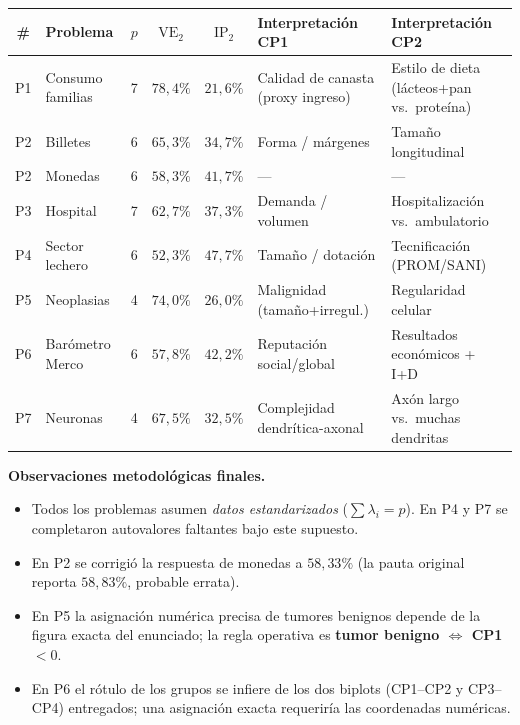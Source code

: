 \documentclass[11pt,a4paper]{article}
\begin{document}
\begin{center}\small
\begin{tabular}{clcccp{4cm}p{4cm}}\toprule
\# & Problema & $p$ & $\mathrm{VE}_2$ & $\mathrm{IP}_2$ & Interpretación CP1 & Interpretación CP2\\\midrule
P1 & Consumo familias    & 7 & $78{,}4\%$ & $21{,}6\%$ & Calidad de canasta (proxy ingreso) & Estilo de dieta (lácteos+pan vs.\ proteína)\\
P2 & Billetes            & 6 & $65{,}3\%$ & $34{,}7\%$ & Forma / márgenes              & Tamaño longitudinal\\
P2 & Monedas             & 6 & $58{,}3\%$ & $41{,}7\%$ & ---                            & ---\\
P3 & Hospital            & 7 & $62{,}7\%$ & $37{,}3\%$ & Demanda / volumen              & Hospitalización vs.\ ambulatorio\\
P4 & Sector lechero      & 6 & $52{,}3\%$ & $47{,}7\%$ & Tamaño / dotación             & Tecnificación (PROM/SANI)\\
P5 & Neoplasias          & 4 & $74{,}0\%$ & $26{,}0\%$ & Malignidad (tamaño+irregul.)   & Regularidad celular\\
P6 & Barómetro Merco     & 6 & $57{,}8\%$ & $42{,}2\%$ & Reputación social/global       & Resultados económicos + I+D\\
P7 & Neuronas            & 4 & $67{,}5\%$ & $32{,}5\%$ & Complejidad dendrítica-axonal  & Axón largo vs.\ muchas dendritas\\
\bottomrule
\end{tabular}\end{center}

\bigskip
\textbf{Observaciones metodológicas finales.}
\begin{itemize}[leftmargin=*]
\item Todos los problemas asumen \emph{datos estandarizados} ($\sum\lambda_i = p$). En P4 y P7 se completaron autovalores faltantes bajo este supuesto.
\item En P2 se corrigió la respuesta de monedas a $58{,}33\%$ (la pauta original reporta $58{,}83\%$, probable errata).
\item En P5 la asignación numérica precisa de tumores benignos depende de la figura exacta del enunciado; la regla operativa es \textbf{tumor benigno $\Leftrightarrow$ CP1$<0$}.
\item En P6 el rótulo de los grupos se infiere de los dos biplots (CP1--CP2 y CP3--CP4) entregados; una asignación exacta requeriría las coordenadas numéricas.
\end{itemize}
\end{document}
